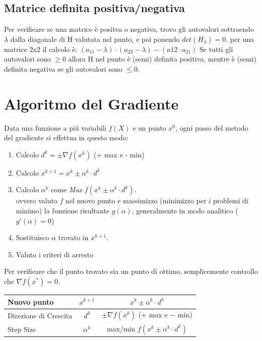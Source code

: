 \documentclass[12pt, a4paper, openany]{book}
\begin{document}
\subsection{Matrice definita positiva/negativa}
Per verificare se una matrice è positva o negativa, trovo gli autovalori sottraendo $\lambda$ dalla diagonale di H valutata nel punto, e poi ponendo $det(H_\lambda) = 0$.
per una matrice 2x2 il calcolo è: $(a_{11}-\lambda)\cdot(a_{22} - \lambda) - (a{12} \cdot a_{21})$
Se tutti gli autovalori sono $\geq 0$ allora H nel punto è (semi) definita positiva, mentre è (semi) definita negativa se gli autovalori sono $\leq 0$.

\section{Algoritmo del Gradiente}
Data una funzione a piú variabili $f(X)$ e un punto $x^0$, ogni passo del metodo del gradiente si effettua in questo modo:

\begin{enumerate}
	\item Calcolo $d^k=\pm \nabla f(x^k)$ ($+$ max e - min)
	\item Calcolo $x^{k+1} = x^k \pm \alpha^k \cdot d^k$
	\item Calcolo $\alpha^k$ come \emph{Max} $f(x^k \pm \alpha^k \cdot d^k)$.
			\\\small{ovvero valuto $f$ nel nuovo punto e massimizzo (minimizzo per i problemi di minimo) la funzione risultante $g(\alpha)$, generalmente in modo analitico ($g'(\alpha)=0$)}
	\item Sostituisco $\alpha$ trovato in $x^{k+1}$.
	\item Valuto i criteri di arresto
\end{enumerate}
Per verificare che il punto trovato sia un punto di ottimo, semplicemente controllo che $\nabla f(x^*) = 0$.
\begin{center}
	\begin{tabular}{|l|c|c|}
		\hline
		Nuovo punto & $x^{k+1}$ & $ x^k \pm \alpha^k \cdot d^k$\\
		\hline
		Direzione di Crescita & $d^k$ & $\pm \nabla f(x^k)$ ($+$ max e $-$ min)\\
		\hline
		Step Size & $\alpha^k$ & max/min $f(x^k \pm \alpha^k \cdot d^k)$\\
		\hline
	\end{tabular}
\end{center}

\pagebreak
\end{document}

